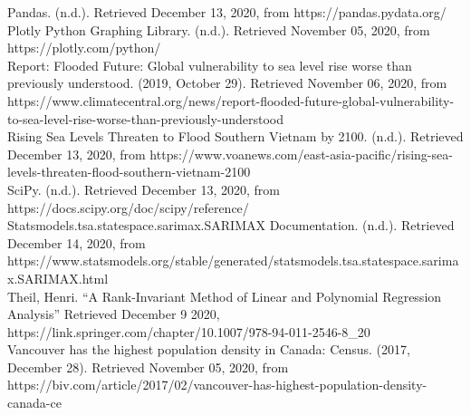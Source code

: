 \documentclass[fontsize=11pt]{article}
\begin{document}
\begin{hangparas}{.25in}{1}
        Pandas. (n.d.). Retrieved December 13, 2020, from https://pandas.pydata.org/ \\

        Plotly Python Graphing Library. (n.d.). Retrieved November 05, 2020, from https://plotly.com/python/ \\

        Report: Flooded Future: Global vulnerability to sea level rise worse than previously understood. (2019, October 29). Retrieved November 06, 2020, from https://www.climatecentral.org/news/report-flooded-future-global-vulnerability-to-sea-level-rise-worse-than-previously-understood \\

        Rising Sea Levels Threaten to Flood Southern Vietnam by 2100. (n.d.). Retrieved December 13, 2020, from https://www.voanews.com/east-asia-pacific/rising-sea-levels-threaten-flood-southern-vietnam-2100 \\

        SciPy. (n.d.). Retrieved December 13, 2020, from
        https://docs.scipy.org/doc/scipy/reference/ \\

        Statsmodels.tsa.statespace.sarimax.SARIMAX Documentation. (n.d.). Retrieved December 14, 2020, from \\ https://www.statsmodels.org/stable/generated/statsmodels.tsa.statespace.sarimax.SARIMAX.html \\

        Theil, Henri. “A Rank-Invariant Method of Linear and Polynomial Regression Analysis” Retrieved December 9 2020, https://link.springer.com/chapter/10.1007/978-94-011-2546-8_20 \\

        Vancouver has the highest population density in Canada: Census. (2017, December 28). Retrieved November 05, 2020, from https://biv.com/article/2017/02/vancouver-has-highest-population-density-canada-ce

    \end{hangparas}
\end{document}
